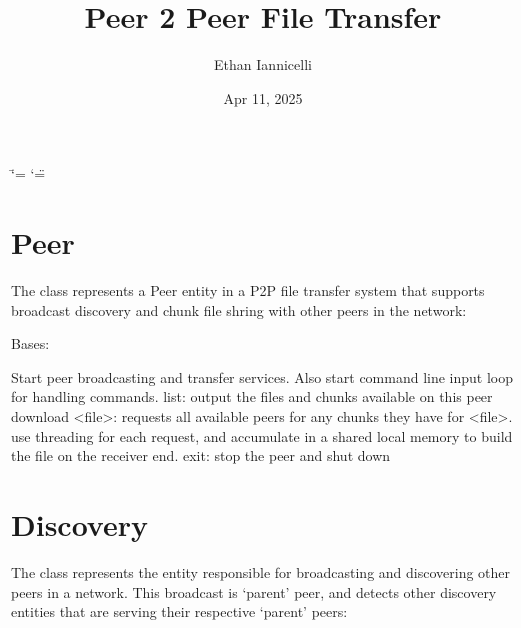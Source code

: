 \documentclass[letterpaper,10pt,english,openany,oneside]{sphinxmanual}
\title{Peer 2 Peer File Transfer}
\date{Apr 11, 2025}
\author{Ethan Iannicelli}
\begin{document}
\ifdefined\shorthandoff
  \ifnum\catcode`\=\string=\active\shorthandoff{=}\fi
  \ifnum\catcode`\"=\active{}\fi
\fi

\pagestyle{empty}
\sphinxmaketitle
\pagestyle{plain}
\sphinxtableofcontents
\pagestyle{normal}
\label{\detokenize{index::doc}}



\chapter{Peer}
\label{\detokenize{index:peer}}
\sphinxAtStartPar
The  class represents a Peer entity in a P2P file transfer
system that supports broadcast discovery and chunk file shring with
other peers in the network:

\begin{fulllineitems}
\label{\detokenize{index:peer.Peer}}
\pysigstartsignatures
\pysiglinewithargsret
{}
{\sphinxparamcomma {}}
{}
\pysigstopsignatures
\sphinxAtStartPar
Bases: 

\begin{fulllineitems}
\label{\detokenize{index:peer.Peer.start}}
\pysigstartsignatures
\pysiglinewithargsret
{}
{}
{}
\pysigstopsignatures
\sphinxAtStartPar
Start peer broadcasting and transfer services. Also start command line input loop
for handling commands.
\sphinxhyphen{} list: output the files and chunks available on this peer
\sphinxhyphen{} download \textless{}file\textgreater{}: requests all available peers for any chunks they have for \textless{}file\textgreater{}.
use threading for each request, and accumulate in a shared local memory to build the
file on the receiver end.
\sphinxhyphen{} exit: stop the peer and shut down

\end{fulllineitems}


\end{fulllineitems}



\chapter{Discovery}
\label{\detokenize{index:discovery}}
\sphinxAtStartPar
The  class represents the entity responsible for broadcasting
and discovering other peers in a network. This broadcast is ‘parent’ peer, and
detects other discovery entities that are serving their respective ‘parent’ peers:
\end{document}
